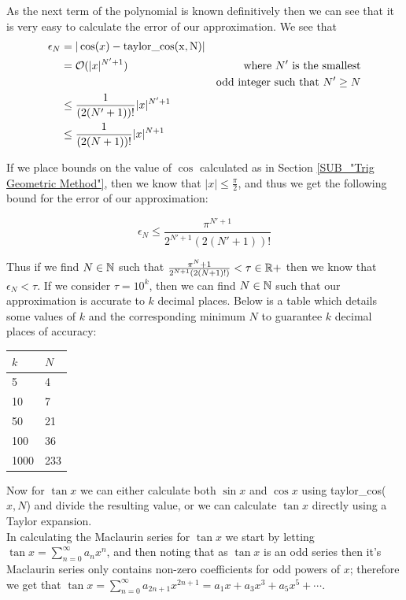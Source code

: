 {As the next term of the polynomial is known definitively then we can see that it is very easy to calculate the error of our approximation. We see that 
\begin{displaymath}
\begin{align*}
	\epsilon_N &= |\cos(x) - \mathrm{taylor\_cos(x,N)}|\\
		&= \mathcal{O}(|x|^{N'+1}) &\textrm{where } N' \textrm{ is the smallest}\\
		&&\textrm{odd integer such that } N'\ge N\\
		&\le \frac{1}{(2(N'+1))!} |x|^{N'+1}\\
		&\le \frac{1}{(2(N+1))!} |x|^{N+1}
\end{align*}
\end{displaymath}

If we place bounds on the value of \(\cos\) calculated as in Section \ref{SUB_"Trig Geometric Method"}, then we know that \(|x| \le \frac{\pi}{2}\), and thus we get the following bound for the error of our approximation:

\[\epsilon_N \le \frac{\pi^{N' + 1}}{2^{N'+1}(2(N'+1))!}\]

Thus if we find \(N \in \mathbb{N}\) such that \(\frac{\pi^{N}+1}{2^{N+1}(2(N+1)!)} < \tau \in \mathbb{R}+\) then we know that \(\epsilon_N < \tau\). If we consider \(\tau = 10^k\), then we can find \(N \in \mathbb{N}\) such that our approximation is accurate to \(k\) decimal places. Below is a table which details some values of \(k\) and the corresponding minimum \(N\) to guarantee \(k\) decimal places of accuracy:

\begin{center}
\begin{tabular}{|p{3cm}|p{3cm}|}
	\hline
	\(k\) & \(N\)\\
	\hline
	5 & 4\\\hline
	10 & 7\\\hline
	50 & 21\\\hline
	100 & 36\\\hline
	1000 & 233\\\hline
\end{tabular}
\end{center}

Now for \(\tan x\) we can either calculate both \(\sin x\) and \(\cos x\) using \textrm{taylor\_cos(\(x,N\))} and divide the resulting value, or we can calculate \(\tan x\) directly using a Taylor expansion.\\

In calculating the Maclaurin series for \(\tan x\) we start by letting \(\tan x = \sum_{n=0}^\infty a_nx^n\), and then noting that as \(\tan x\) is an odd series then it's Maclaurin series only contains non-zero coefficients for odd powers of \(x\)\cite{ONL_OddFunc}; therefore we get that \(\tan x = \sum_{n=0}^\infty a_{2n+1}x^{2n+1} = a_1x + a_3x^3 + a_5x^5 + \cdots\).\\

}
